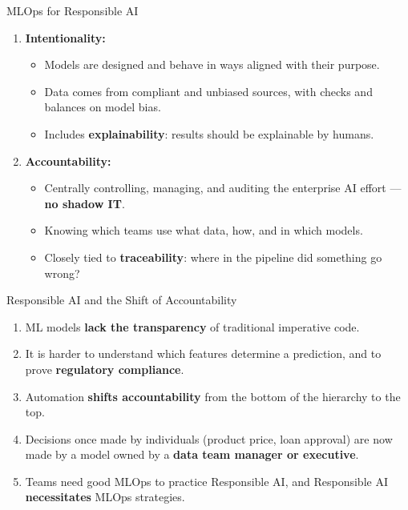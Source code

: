 \begin{frame}{MLOps for Responsible AI}
\begin{enumerate}
\item<1-> \textbf{Intentionality:}
    \begin{itemize}
    \item Models are designed and behave in ways aligned with their purpose.
    \item Data comes from compliant and unbiased sources, with checks and balances on model bias.
    \item Includes \textbf{explainability}: results should be explainable by humans.
    \end{itemize}
\item<2-> \textbf{Accountability:}
    \begin{itemize}
    \item Centrally controlling, managing, and auditing the enterprise AI effort --- \textbf{no shadow IT}.
    \item Knowing which teams use what data, how, and in which models.
    \item Closely tied to \textbf{traceability}: where in the pipeline did something go wrong?
    \end{itemize}
\end{enumerate}
\end{frame}

\begin{frame}{Responsible AI and the Shift of Accountability}
\begin{enumerate}
\item<1-> ML models \textbf{lack the transparency} of traditional imperative code.
\item<2-> It is harder to understand which features determine a prediction, and to prove \textbf{regulatory compliance}.
\item<3-> Automation \textbf{shifts accountability} from the bottom of the hierarchy to the top.
\item<4-> Decisions once made by individuals (product price, loan approval) are now made by a model owned by a \textbf{data team manager or executive}.
\item<5-> Teams need good MLOps to practice Responsible AI, and Responsible AI \textbf{necessitates} MLOps strategies.
\end{enumerate}
\end{frame}

